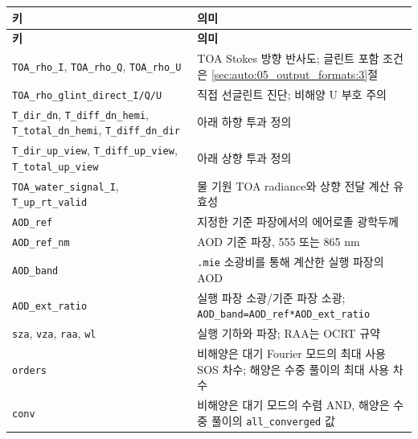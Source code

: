 {\TableFont
\begin{longtable}{@{}>{\raggedright\arraybackslash}p{}>{\raggedright\arraybackslash}p{}@{}}
\toprule
\textbf{키} & \textbf{의미} \\
\midrule
\endfirsthead
\toprule
\textbf{키} & \textbf{의미} \\
\midrule
\endhead
\bottomrule
\endfoot
\texttt{TOA\_\allowbreak{}rho\_\allowbreak{}I}, \texttt{TOA\_\allowbreak{}rho\_\allowbreak{}Q}, \texttt{TOA\_\allowbreak{}rho\_\allowbreak{}U} & TOA Stokes 방향 반사도; 글린트 포함 조건은 \ref{sec:auto:05_output_formats:3}절 \\
\texttt{TOA\_\allowbreak{}rho\_\allowbreak{}glint\_\allowbreak{}direct\_\allowbreak{}I/\allowbreak{}Q/\allowbreak{}U} & 직접 선글린트 진단; 비해양 U 부호 주의 \\
\texttt{T\_\allowbreak{}dir\_\allowbreak{}dn}, \texttt{T\_\allowbreak{}diff\_\allowbreak{}dn\_\allowbreak{}hemi}, \texttt{T\_\allowbreak{}total\_\allowbreak{}dn\_\allowbreak{}hemi}, \texttt{T\_\allowbreak{}diff\_\allowbreak{}dn\_\allowbreak{}dir} & 아래 하향 투과 정의 \\
\texttt{T\_\allowbreak{}dir\_\allowbreak{}up\_\allowbreak{}view}, \texttt{T\_\allowbreak{}diff\_\allowbreak{}up\_\allowbreak{}view}, \texttt{T\_\allowbreak{}total\_\allowbreak{}up\_\allowbreak{}view} & 아래 상향 투과 정의 \\
\texttt{TOA\_\allowbreak{}water\_\allowbreak{}signal\_\allowbreak{}I}, \texttt{T\_\allowbreak{}up\_\allowbreak{}rt\_\allowbreak{}valid} & 물 기원 TOA radiance와 상향 전달 계산 유효성 \\
\texttt{AOD\_\allowbreak{}ref} & 지정한 기준 파장에서의 에어로졸 광학두께 \\
\texttt{AOD\_\allowbreak{}ref\_\allowbreak{}nm} & AOD 기준 파장, 555 또는 865 nm \\
\texttt{AOD\_\allowbreak{}band} & \texttt{.\allowbreak{}mie} 소광비를 통해 계산한 실행 파장의 AOD \\
\texttt{AOD\_\allowbreak{}ext\_\allowbreak{}ratio} & 실행 파장 소광/기준 파장 소광; \texttt{AOD\_\allowbreak{}band=\allowbreak{}AOD\_\allowbreak{}ref*AOD\_\allowbreak{}ext\_\allowbreak{}ratio} \\
\texttt{sza}, \texttt{vza}, \texttt{raa}, \texttt{wl} & 실행 기하와 파장; RAA는 OCRT 규약 \\
\texttt{orders} & 비해양은 대기 Fourier 모드의 최대 사용 SOS 차수; 해양은 수중 풀이의 최대 사용 차수 \\
\texttt{conv} & 비해양은 대기 모드의 수렴 AND, 해양은 수중 풀이의 \texttt{all\_\allowbreak{}converged} 값 \\
\end{longtable}
}

